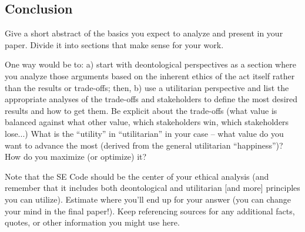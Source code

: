 \documentclass[12pt]{article}
\begin{document}
\begin{multicols}{2}
\section{Conclusion}
Give a short abstract of the basics you expect to analyze and present in your paper. Divide it into sections that make sense for your work.

One way would be to: a) start with deontological perspectives as a section where you analyze those arguments based on the inherent ethics of the act itself rather than the results or trade-offs; then, b) use a utilitarian perspective and list the appropriate analyses of the trade-offs and stakeholders to define the most desired results and how to get them. Be explicit about the trade-offs (what value is balanced against what other value, which stakeholders win, which stakeholders lose...) What is the ``utility'' in ``utilitarian'' in your case -- what value do you want to advance the most (derived from the general utilitarian ``happiness'')? How do you maximize (or optimize) it?

Note that the SE Code should be the center of your ethical analysis (and remember that it includes both deontological and utilitarian [and more] principles you can utilize). Estimate where you'll end up for your answer (you can change your mind in the final paper!). Keep referencing sources for any additional facts, quotes, or other information you might use here.  \cite{handout}

\end{multicols}
\newpage

\nocite{*}


\newpage
\end{document}
